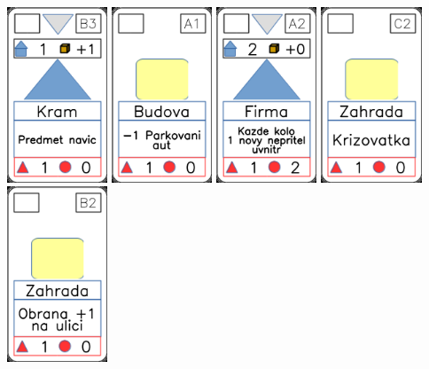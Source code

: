 \documentclass[a4paper]{article}
\begin{document}
	\includegraphics[width=3.0cm]{img-3_7}
	\includegraphics[width=3.0cm]{img-2_0}
	\includegraphics[width=3.0cm]{img-3_16}
	\includegraphics[width=3.0cm]{img-2_26}
	\includegraphics[width=3.0cm]{img-2_21}
\end{document}

